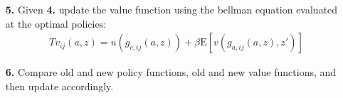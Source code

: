 \documentclass[12pt,pdftex]{article}
\begin{document}
\begin{onehalfspacing}
\begin{itemize}
\item[\textbf{5.}] Given \textbf{4.} update the value function using the bellman equation evaluated at the optimal policies:
\begin{align}
Tv_{ij}(a, z) = u(g_{c,ij}(a,z)) + \beta \mathrm{E}\left[ v(g_{a,ij}(a,z), z') \right]
\end{align}

\item[\textbf{6.}] Compare old and new policy functions, old and new value functions, and then update accordingly.


%
\end{itemize}


\end{onehalfspacing}
\end{document}
